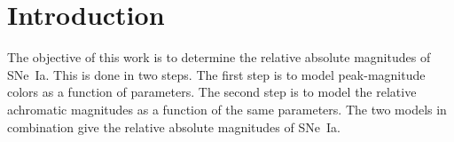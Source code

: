 \documentclass{aastex61}   	%
\begin{document}
% 
%    
%    
%     
% 
% 
%
%
%
%
%   
%    


%

\section{Introduction}
The objective of this work is to determine the relative absolute magnitudes of SNe~Ia.  This is done in two steps.
The first step is to model peak-magnitude colors as a function of parameters.  The second step is to model the relative achromatic magnitudes
as a function of the same parameters.
The two models in combination give the  relative absolute magnitudes of SNe~Ia.
\end{document}
